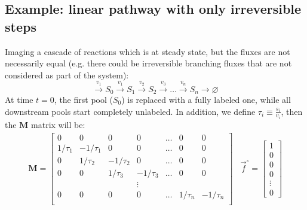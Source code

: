 \documentclass{article}
\newcommand{\finit}{\vec{f}^\circ}
\begin{document}
\subsection{Example: linear pathway with only irreversible steps}
Imaging a cascade of reactions which is at steady state, but the fluxes are not necessarily equal (e.g. there could be irreversible branching fluxes that are not considered as part of the system):
\begin{equation}
    \xrightarrow{v_1} S_0 
    \xrightarrow{v_1} S_1 
    \xrightarrow{v_2} S_2
    \xrightarrow{v_3} \ldots 
    \xrightarrow{v_n} S_n
    \rightarrow \varnothing
\end{equation}
At time $t = 0$, the first pool ($S_0$) is replaced with a fully labeled one, while all downstream pools start completely unlabeled. In addition, we define $\tau_i \equiv \frac{s_i}{v_i}$, then the $\mathbf{M}$ matrix will be:
\begin{eqnarray}
\mathbf{M} =
  \begin{bmatrix}
    0 & 0 & 0 & 0 & \ldots & 0 & 0\\
    1/\tau_1 & -1/\tau_1 & 0 & 0 & \ldots & 0 & 0\\
    0 & 1/\tau_2 & -1/\tau_2 & 0 & \ldots & 0 & 0\\
    0 & 0 & 1/\tau_3 & -1/\tau_3 & \ldots & 0 & 0\\
    & & & \vdots & & &\\
    0 & 0 & 0 & 0 & \ldots & 1/\tau_n & -1/\tau_n \\
  \end{bmatrix}
  ~~~~
  \finit = 
  \begin{bmatrix}
  1 \\ 0 \\ 0 \\ 0 \\ \vdots \\ 0
  \end{bmatrix}
\end{eqnarray}
\end{document}

